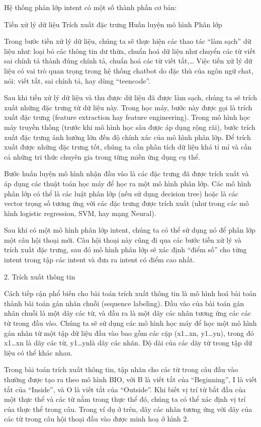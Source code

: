 Hệ thống phân lớp intent có một số thành phần cơ bản:

Tiền xử lý dữ liệu
Trích xuất đặc trưng
Huấn luyện mô hình
Phân lớp

Trong bước tiền xử lý dữ liệu, chúng ta sẽ thực hiện các thao tác “làm sạch” dữ liệu như: loại bỏ các thông tin dư thừa, chuẩn hoá dữ liệu như chuyển các từ viết sai chính tả thành đúng chính tả, chuẩn hoá các từ viết tắt,… Việc tiền xử lý dữ liệu có vai trò quan trọng trong hệ thống chatbot do đặc thù của ngôn ngữ chat, nói: viết tắt, sai chính tả, hay dùng “teencode”.

Sau khi tiền xử lý dữ liệu và thu được dữ liệu đã được làm sạch, chúng ta sẽ trích xuất những đặc trưng từ dữ liệu này. Trong học máy, bước này được gọi là trích xuất đặc trưng (feature extraction hay feature engineering). Trong mô hình học máy truyền thống (trước khi mô hình học sâu được áp dụng rộng rãi), bước trích xuất đặc trưng ảnh hưởng lớn đến độ chính xác của mô hình phân lớp. Để trích xuất được những đặc trưng tốt, chúng ta cần phân tích dữ liệu khá tỉ mỉ và cần cả những tri thức chuyên gia trong từng miền ứng dụng cụ thể.

Bước huấn luyện mô hình nhận đầu vào là các đặc trưng đã được trích xuất và áp dụng các thuật toán học máy để học ra một mô hình phân lớp. Các mô hình phân lớp có thể là các luật phân lớp (nếu sử dụng decision tree) hoặc là các vector trọng số tương ứng với các đặc trưng được trích xuất (như trong các mô hình logistic regression, SVM, hay mạng Neural).

Sau khi có một mô hình phân lớp intent, chúng ta có thể sử dụng nó để phân lớp một câu hội thoại mới. Câu hội thoại này cũng đi qua các bước tiền xử lý và trích xuất đặc trưng, sau đó mô hình phân lớp sẽ xác định “điểm số” cho từng intent trong tập các intent và đưa ra intent có điểm cao nhất.

2. Trích xuất thông tin

Cách tiếp cận phổ biến cho bài toán trích xuất thông tin là mô hình hoá bài toán thành bài toán gán nhãn chuỗi (sequence labeling). Đầu vào của bài toán gán nhãn chuỗi là một dãy các từ, và đầu ra là một dãy các nhãn tương ứng các các từ trong đầu vào. Chúng ta sẽ sử dụng các mô hình học máy để học một mô hình gán nhãn từ một tập dữ liệu đầu vào bao gồm các cặp (x1…xn, y1…yn), trong đó x1…xn là dãy các từ, y1…ynlà dãy các nhãn. Độ dài của các dãy từ trong tập dữ liệu có thể khác nhau.

Trong bài toán trích xuất thông tin, tập nhãn cho các từ trong câu đầu vào thường được tạo ra theo  mô hình BIO, với B là viết tắt của “Beginning”, I là viết tắt của “Inside”, và O là viết tắt của “Outside”. Khi biết vị trí từ bắt đầu của một thực thể và các từ nằm trong thực thể đó, chúng ta có thể xác định vị trí của thực thể trong câu. Trong ví dụ ở trên, dãy các nhãn tương ứng với dãy của các từ trong câu hội thoại đầu vào được minh hoạ ở hình 2.

